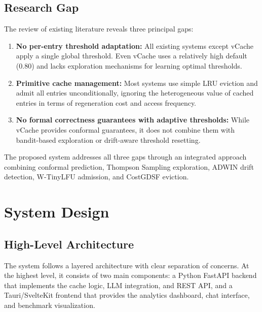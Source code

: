 \documentclass[12pt,a4paper]{report}
\begin{document}
\section{Research Gap}

The review of existing literature reveals three principal gaps:

\begin{enumerate}[label=(\roman*),leftmargin=2cm]
\item \textbf{No per-entry threshold adaptation:} All existing systems except vCache apply a single global threshold. Even vCache uses a relatively high default (0.80) and lacks exploration mechanisms for learning optimal thresholds.

\item \textbf{Primitive cache management:} Most systems use simple LRU eviction and admit all entries unconditionally, ignoring the heterogeneous value of cached entries in terms of regeneration cost and access frequency.

\item \textbf{No formal correctness guarantees with adaptive thresholds:} While vCache provides conformal guarantees, it does not combine them with bandit-based exploration or drift-aware threshold resetting.
\end{enumerate}

The proposed system addresses all three gaps through an integrated approach combining conformal prediction, Thompson Sampling exploration, ADWIN drift detection, W-TinyLFU admission, and CostGDSF eviction.


\chapter{System Design}

\section{High-Level Architecture}

The system follows a layered architecture with clear separation of concerns. At the highest level, it consists of two main components: a Python FastAPI backend that implements the cache logic, LLM integration, and REST API, and a Tauri/SvelteKit frontend that provides the analytics dashboard, chat interface, and benchmark visualization.
\end{document}
